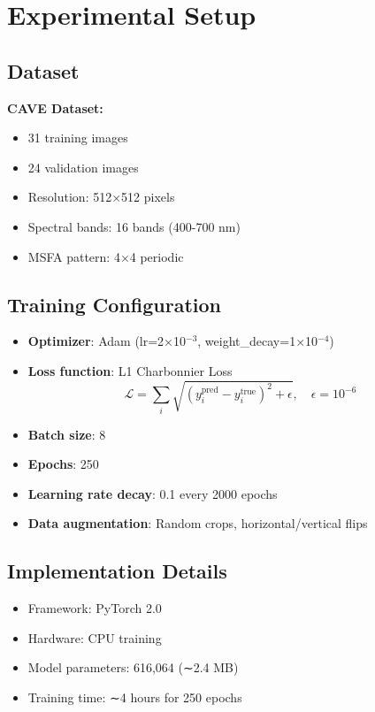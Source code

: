 \documentclass[conference]{IEEEtran}
\begin{document}
\section{Experimental Setup}

\subsection{Dataset}

\textbf{CAVE Dataset:}
\begin{itemize}
    \item 31 training images
    \item 24 validation images
    \item Resolution: 512×512 pixels
    \item Spectral bands: 16 bands (400-700 nm)
    \item MSFA pattern: 4×4 periodic
\end{itemize}

\subsection{Training Configuration}

\begin{itemize}
    \item \textbf{Optimizer}: Adam (lr=2×10$^{-3}$, weight\_decay=1×10$^{-4}$)
    \item \textbf{Loss function}: L1 Charbonnier Loss
    \begin{equation}
    \mathcal{L} = \sum_{i} \sqrt{(y_i^{\text{pred}} - y_i^{\text{true}})^2 + \epsilon}, \quad \epsilon=10^{-6}
    \end{equation}
    \item \textbf{Batch size}: 8
    \item \textbf{Epochs}: 250
    \item \textbf{Learning rate decay}: 0.1 every 2000 epochs
    \item \textbf{Data augmentation}: Random crops, horizontal/vertical flips
\end{itemize}

\subsection{Implementation Details}

\begin{itemize}
    \item Framework: PyTorch 2.0
    \item Hardware: CPU training
    \item Model parameters: 616,064 (∼2.4 MB)
    \item Training time: ∼4 hours for 250 epochs
\end{itemize}
\end{document}
